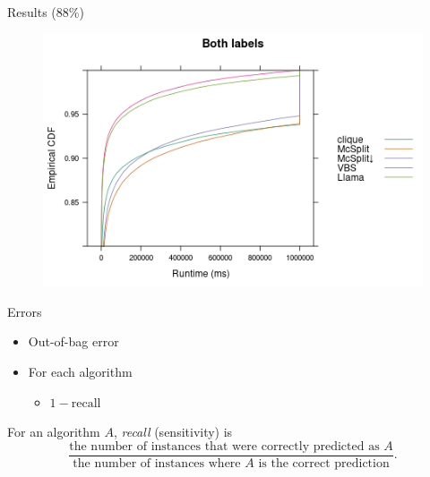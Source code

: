 \documentclass{beamer}
\begin{document}
\begin{frame}{Results (88\%)}
  \begin{figure}
    \centering
    \includegraphics[width=\textwidth]{../dissertation/images/ecdf_both_labels_llama.png}
  \end{figure}
\end{frame}


\begin{frame}{Errors}
  \begin{itemize}
  \item Out-of-bag error
  \item For each algorithm
    \begin{itemize}
    \item $1 - \text{recall}$
    \end{itemize}
  \end{itemize}
  \begin{definition}
    For an algorithm $A$, \emph{recall} (sensitivity) is
    \[ \frac{\text{the number of instances that were correctly predicted as
          $A$}}{\text{the number of instances where $A$ is the correct
          prediction}}. \]
  \end{definition}
\end{frame}
\end{document}
